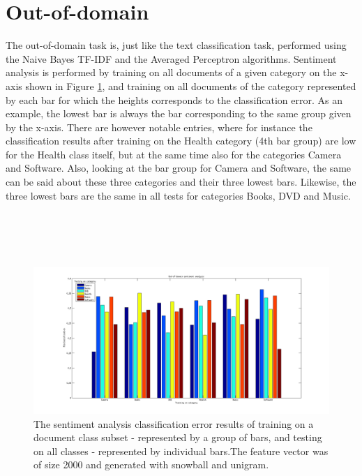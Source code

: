\section{Out-of-domain}
The out-of-domain task is, just like the text classification task, performed using the Naive Bayes TF-IDF and the Averaged Perceptron algorithms. Sentiment analysis is performed by training on all documents of a given category on the x-axis shown in Figure \ref{fig:outofdomain}, and training on all documents of the category represented by each bar for which the heights corresponds to the classification error. As an example, the lowest bar is always the bar corresponding to the same group given by the x-axis. There are however notable entries, where for instance the classification results after training on the Health category (4th bar group) are low for the Health class itself, but at the same time also for the categories Camera and Software. Also, looking at the bar group for Camera and Software, the same can be said about these three categories and their three lowest bars. Likewise, the three lowest bars are the same in all tests for categories Books, DVD and Music.\\\\\\\\\\

\begin{figure}[h!]
\centering
\includegraphics[width=1\linewidth]{../Plottar/outofdomain.png}
\caption{The sentiment analysis classification error results of training on a document class subset - represented by a group of bars, and testing on all classes - represented by individual bars.The feature vector was of size 2000 and generated with snowball and unigram. }
\label{fig:outofdomain}
\end{figure}  

